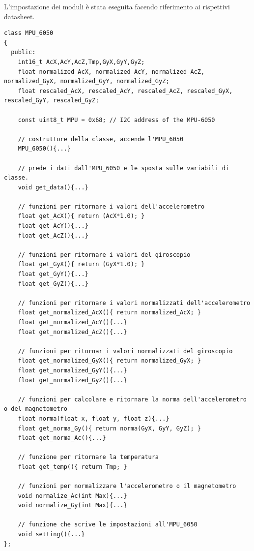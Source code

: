 \documentclass[10pt,a4paper]{article}
\begin{document}
L'impostazione dei moduli \`e stata eseguita facendo riferimento ai rispettivi datasheet. 
\begin{lstlisting}[style=myArduino, caption=classe "MPU\_6050", captionpos=b]
class MPU_6050
{
  public:
    int16_t AcX,AcY,AcZ,Tmp,GyX,GyY,GyZ;
    float normalized_AcX, normalized_AcY, normalized_AcZ, normalized_GyX, normalized_GyY, normalized_GyZ;
    float rescaled_AcX, rescaled_AcY, rescaled_AcZ, rescaled_GyX, rescaled_GyY, rescaled_GyZ;
  
    const uint8_t MPU = 0x68; // I2C address of the MPU-6050
    
    // costruttore della classe, accende l'MPU_6050
    MPU_6050(){...}
  
    // prede i dati dall'MPU_6050 e le sposta sulle variabili di classe.
    void get_data(){...}
  
    // funzioni per ritornare i valori dell'accelerometro
    float get_AcX(){ return (AcX*1.0); }
    float get_AcY(){...}
    float get_AcZ(){...}
  
    // funzioni per ritornare i valori del giroscopio
    float get_GyX(){ return (GyX*1.0); }
    float get_GyY(){...}
    float get_GyZ(){...}
    
    // funzioni per ritornare i valori normalizzati dell'accelerometro
    float get_normalized_AcX(){ return normalized_AcX; }
    float get_normalized_AcY(){...}
    float get_normalized_AcZ(){...}
  
    // funzioni per ritornar i valori normalizzati del giroscopio
    float get_normalized_GyX(){ return normalized_GyX; }
    float get_normalized_GyY(){...}
    float get_normalized_GyZ(){...}
  
    // funzioni per calcolare e ritornare la norma dell'accelerometro o del magnetometro
    float norma(float x, float y, float z){...}
    float get_norma_Gy(){ return norma(GyX, GyY, GyZ); }
    float get_norma_Ac(){...}
  
    // funzione per ritornare la temperatura
    float get_temp(){ return Tmp; }
  
    // funzioni per normalizzare l'accelerometro o il magnetometro
    void normalize_Ac(int Max){...}
    void normalize_Gy(int Max){...}
    
    // funzione che scrive le impostazioni all'MPU_6050
    void setting(){...}
};
\end{lstlisting}
\end{document}
